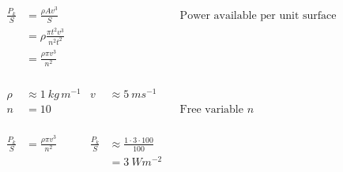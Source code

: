 \documentclass[12pt]{article}
\begin{document}
\begin{align*}
	\phantom{=}                                                                                                                                                                                  \\
	\phantom{=}                                                                                                                                                                                  \\
	\frac{P_k}{S} & = \frac{\rho Av^3}{S}                   &                                            &              &  & \text{Power available per unit surface}                             \\
	              & = \rho \frac{\pi t^2 v^3}{n^2 t^2}                                                                                                                                           \\
	              & = \frac{\rho \pi v^3}{n^2}                                                                                                                                                   \\
	\phantom{=}                                                                                                                                                                                  \\
	\phantom{=}                                                                                                                                                                                  \\
	\rho          & \approx 1 ~kg \, m^{-1}
	              & v                                       & \approx 5 ~ms^{-1}                                                                                                                 \\
	n             & = 10                                    &                                            &              &  & \text{Free variable } n                                             \\
	\phantom{=}                                                                                                                                                                                  \\
	\phantom{=}                                                                                                                                                                                  \\
	\frac{P_k}{S} & = \frac{\rho \pi v^3}{n^2}              &
	\frac{P_k}{S} & \approx \frac{1 \cdot 3 \cdot 100}{100}                                                                                                                                      \\
	              &                                         &                                            & = 3 ~Wm^{-2}                                                                          \\
\end{align*}
\end{document}
